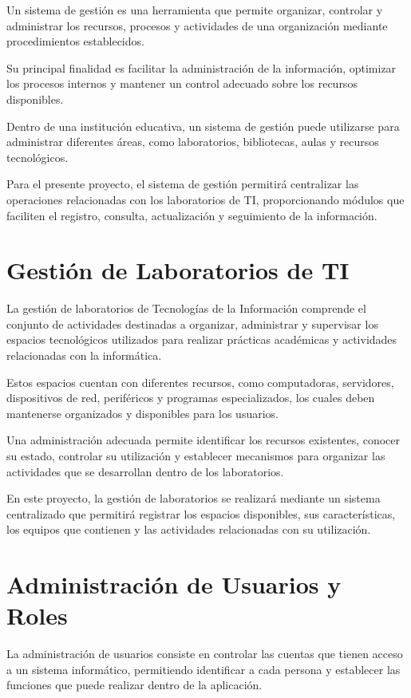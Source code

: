 Un sistema de gestión es una herramienta que permite organizar, controlar y administrar los recursos, procesos y actividades de una organización mediante procedimientos establecidos.

Su principal finalidad es facilitar la administración de la información, optimizar los procesos internos y mantener un control adecuado sobre los recursos disponibles.

Dentro de una institución educativa, un sistema de gestión puede utilizarse para administrar diferentes áreas, como laboratorios, bibliotecas, aulas y recursos tecnológicos.

Para el presente proyecto, el sistema de gestión permitirá centralizar las operaciones relacionadas con los laboratorios de TI, proporcionando módulos que faciliten el registro, consulta, actualización y seguimiento de la información.

\section{Gestión de Laboratorios de TI}

La gestión de laboratorios de Tecnologías de la Información comprende el conjunto de actividades destinadas a organizar, administrar y supervisar los espacios tecnológicos utilizados para realizar prácticas académicas y actividades relacionadas con la informática.

Estos espacios cuentan con diferentes recursos, como computadoras, servidores, dispositivos de red, periféricos y programas especializados, los cuales deben mantenerse organizados y disponibles para los usuarios.

Una administración adecuada permite identificar los recursos existentes, conocer su estado, controlar su utilización y establecer mecanismos para organizar las actividades que se desarrollan dentro de los laboratorios.

En este proyecto, la gestión de laboratorios se realizará mediante un sistema centralizado que permitirá registrar los espacios disponibles, sus características, los equipos que contienen y las actividades relacionadas con su utilización.

\section{Administración de Usuarios y Roles}

La administración de usuarios consiste en controlar las cuentas que tienen acceso a un sistema informático, permitiendo identificar a cada persona y establecer las funciones que puede realizar dentro de la aplicación.

